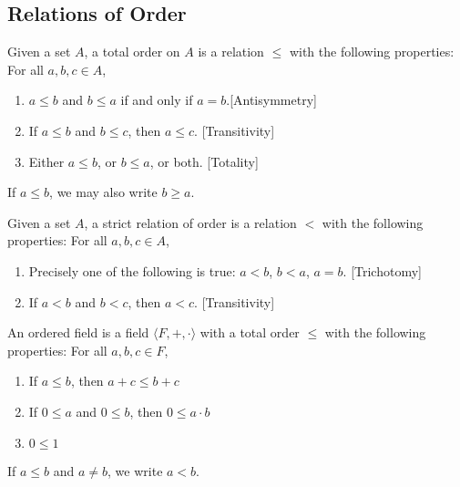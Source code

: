 \documentclass[crop=false,class=article,oneside]{standalone}
\begin{document}
    \subsection{Relations of Order}
        \begin{definition}
            Given a set $A$, a total order on $A$ is a relation $\leq$ with the following properties: For all $a,b,c\in A$,
            \begin{enumerate}
                \item $a\leq b$ and $b\leq a$ if and only if $a=b$.\hfill [Antisymmetry]
                \item If $a\leq b$ and $b\leq c$, then $a\leq c$. \hfill [Transitivity]
                \item Either $a\leq b$, or $b\leq a$, or both. \hfill [Totality]
            \end{enumerate}
        \end{definition}
            \begin{remark}
            If $a\leq b$, we may also write $b\geq a$.
            \end{remark}
            \begin{definition}
            Given a set $A$, a strict relation of order is a relation $<$ with the following properties: For all $a,b,c\in A$,
            \begin{enumerate}
                \item Precisely one of the following is true: $a<b$, $b<a$, $a=b$. \hfill [Trichotomy]
                \item If $a<b$ and $b<c$, then $a<c$. \hfill [Transitivity]
            \end{enumerate}
            \end{definition}
            \begin{definition}
            An ordered field is a field $\langle F,+,\cdot \rangle$ with a total order $\leq$ with the following properties: For all $a,b,c\in F$,
            \begin{enumerate}
                \item If $a\leq b$, then $a+c\leq b+c$
                \item If $0 \leq a$ and $0\leq b$, then $0\leq a\cdot b$
                \item $0\leq 1$
            \end{enumerate}
            \end{definition}
            \begin{remark}
            If $a\leq b$ and $a\ne b$, we write $a<b$.
            \end{remark}
\end{document}
